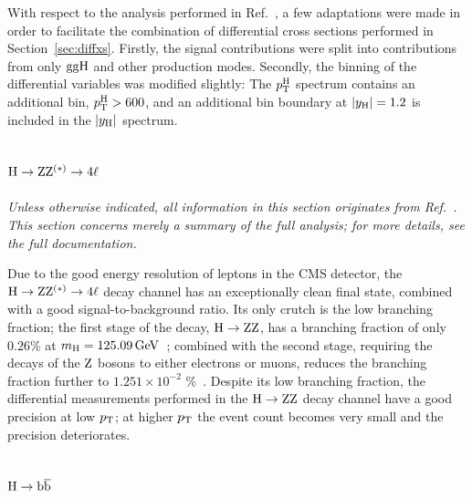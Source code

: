  With respect to the analysis performed in Ref.~\cite{Sirunyan:2018kta}, a few adaptations were made in order to facilitate the combination of differential cross sections performed in Section~\ref{sec:diffxs}.
% 
Firstly, the signal contributions were split into contributions from only $\mathrm{g}\mathrm{g}\mathrm{H}$ and other production modes.
% 
Secondly, the binning of the differential variables was modified slightly: The $p_\mathrm{T}^\mathrm{H}$ spectrum contains an additional bin, $p_\mathrm{T}^\mathrm{H}>600$\GeV, and an additional bin boundary at $\left|y_\mathrm{H}\right|  = 1.2$ is included in the $\left|y_\mathrm{H}\right| $ spectrum.



\subsection{\texorpdfstring{$\mathrm{H}\to\mathrm{Z}\mathrm{Z}^{(\ast)}\to 4\ell$}{H to ZZ to four leptons}}

\emph{%
Unless otherwise indicated, all information in this section originates from Ref.~\cite{Sirunyan:2017exp}. This section concerns merely a summary of the full analysis; for more details, see the full documentation.
}

Due to the good energy resolution of leptons in the CMS detector, the $\mathrm{H}\to\mathrm{Z}\mathrm{Z}^{(\ast)}\to 4\ell$ decay channel has an exceptionally clean final state, combined with a good signal-to-background ratio.
% 
Its only crutch is the low branching fraction; the first stage of the decay, $\mathrm{H}\to\mathrm{Z}\mathrm{Z}$, has a branching fraction of only $0.26\%$ at $m_{\mathrm{H}} = 125.09\,\text{GeV}$~\cite{deFlorian:2016spz}; combined with the second stage, requiring the decays of the $\mathrm{Z}$ bosons to either electrons or muons, reduces the branching fraction further to $1.251 \times 10^{-2}$ \%~\cite{deFlorian:2016spz}.
% 
Despite its low branching fraction, the differential measurements performed in the $\mathrm{H}\to\mathrm{Z}\mathrm{Z}$ decay channel have a good precision at low $p_\mathrm{T}$; at higher $p_\mathrm{T}$ the event count becomes very small and the precision deteriorates.




\subsection{\texorpdfstring{$\mathrm{H}\to\mathrm{b}\overline{\mathrm{b}}$}{H to bb}}




